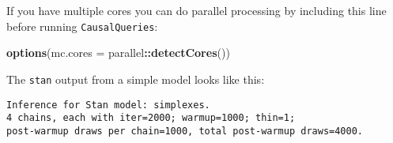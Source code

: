 \documentclass[
  12pt,
]{book}
\newenvironment{Shaded}{\begin{snugshade}}{\end{snugshade}}
\newcommand{\AttributeTok}[1]{\textcolor[rgb]{0.13,0.29,0.53}{#1}}
\newcommand{\FunctionTok}[1]{\textcolor[rgb]{0.13,0.29,0.53}{\textbf{#1}}}
\newcommand{\NormalTok}[1]{#1}
\newcommand{\SpecialCharTok}[1]{\textcolor[rgb]{0.81,0.36,0.00}{\textbf{#1}}}
\begin{document}
If you have multiple cores you can do parallel processing by including this line before running \texttt{CausalQueries}:

\begin{Shaded}
\begin{Highlighting}[]
\FunctionTok{options}\NormalTok{(}\AttributeTok{mc.cores =}\NormalTok{ parallel}\SpecialCharTok{::}\FunctionTok{detectCores}\NormalTok{())}
\end{Highlighting}
\end{Shaded}

The \texttt{stan} output from a simple model looks like this:

\begin{verbatim}
Inference for Stan model: simplexes.
4 chains, each with iter=2000; warmup=1000; thin=1; 
post-warmup draws per chain=1000, total post-warmup draws=4000.


\end{verbatim}
\end{document}
